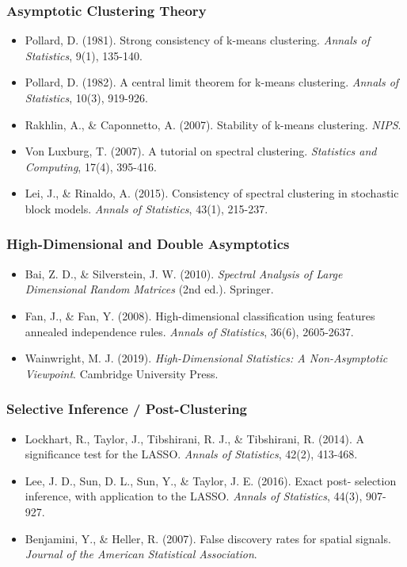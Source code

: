 \documentclass[
  12pt,
]{article}
\providecommand{\tightlist}{%
  \setlength{\itemsep}{0pt}\setlength{\parskip}{0pt}}
\begin{document}
\subsubsection{Asymptotic Clustering
Theory}\label{asymptotic-clustering-theory}

\begin{itemize}
\tightlist
\item
  Pollard, D. (1981). Strong consistency of k-means clustering.
  \emph{Annals of Statistics}, 9(1), 135-140.
\item
  Pollard, D. (1982). A central limit theorem for k-means clustering.
  \emph{Annals of Statistics}, 10(3), 919-926.
\item
  Rakhlin, A., \& Caponnetto, A. (2007). Stability of k-means
  clustering. \emph{NIPS}.
\item
  Von Luxburg, T. (2007). A tutorial on spectral clustering.
  \emph{Statistics and Computing}, 17(4), 395-416.
\item
  Lei, J., \& Rinaldo, A. (2015). Consistency of spectral clustering in
  stochastic block models. \emph{Annals of Statistics}, 43(1), 215-237.
\end{itemize}

\subsubsection{High-Dimensional and Double
Asymptotics}\label{high-dimensional-and-double-asymptotics}

\begin{itemize}
\tightlist
\item
  Bai, Z. D., \& Silverstein, J. W. (2010). \emph{Spectral Analysis of
  Large Dimensional Random Matrices} (2nd ed.). Springer.
\item
  Fan, J., \& Fan, Y. (2008). High-dimensional classification using
  features annealed independence rules. \emph{Annals of Statistics},
  36(6), 2605-2637.
\item
  Wainwright, M. J. (2019). \emph{High-Dimensional Statistics: A
  Non-Asymptotic Viewpoint}. Cambridge University Press.
\end{itemize}

\subsubsection{Selective Inference /
Post-Clustering}\label{selective-inference-post-clustering}

\begin{itemize}
\tightlist
\item
  Lockhart, R., Taylor, J., Tibshirani, R. J., \& Tibshirani, R. (2014).
  A significance test for the LASSO. \emph{Annals of Statistics}, 42(2),
  413-468.
\item
  Lee, J. D., Sun, D. L., Sun, Y., \& Taylor, J. E. (2016). Exact post-
  selection inference, with application to the LASSO. \emph{Annals of
  Statistics}, 44(3), 907-927.
\item
  Benjamini, Y., \& Heller, R. (2007). False discovery rates for spatial
  signals. \emph{Journal of the American Statistical Association}.
\end{itemize}
\end{document}
